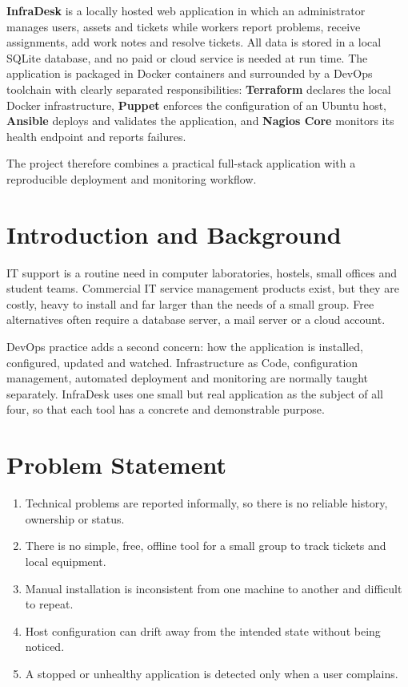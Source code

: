 \documentclass[12pt,a4paper]{article}
\begin{document}
\textbf{InfraDesk} is a locally hosted web application in which an administrator manages users, assets and tickets while workers report problems, receive assignments, add work notes and resolve tickets. All data is stored in a local SQLite database, and no paid or cloud service is needed at run time. The application is packaged in Docker containers and surrounded by a DevOps toolchain with clearly separated responsibilities: \textbf{Terraform} declares the local Docker infrastructure, \textbf{Puppet} enforces the configuration of an Ubuntu host, \textbf{Ansible} deploys and validates the application, and \textbf{Nagios Core} monitors its health endpoint and reports failures.

The project therefore combines a practical full-stack application with a reproducible deployment and monitoring workflow.

\section{Introduction and Background}
IT support is a routine need in computer laboratories, hostels, small offices and student teams. Commercial IT service management products exist, but they are costly, heavy to install and far larger than the needs of a small group. Free alternatives often require a database server, a mail server or a cloud account.

DevOps practice adds a second concern: how the application is installed, configured, updated and watched. Infrastructure as Code, configuration management, automated deployment and monitoring are normally taught separately. InfraDesk uses one small but real application as the subject of all four, so that each tool has a concrete and demonstrable purpose.

\section{Problem Statement}
\begin{enumerate}[leftmargin=*]
  \item Technical problems are reported informally, so there is no reliable history, ownership or status.
  \item There is no simple, free, offline tool for a small group to track tickets and local equipment.
  \item Manual installation is inconsistent from one machine to another and difficult to repeat.
  \item Host configuration can drift away from the intended state without being noticed.
  \item A stopped or unhealthy application is detected only when a user complains.
\end{enumerate}
\end{document}
